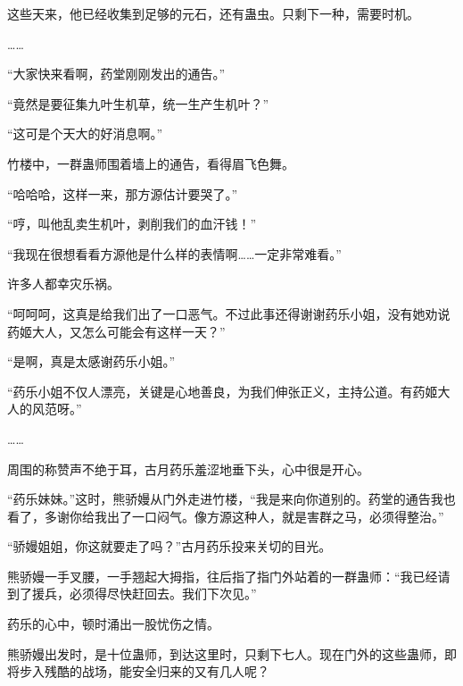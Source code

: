 \begin{this_body}
这些天来，他已经收集到足够的元石，还有蛊虫。只剩下一种，需要时机。

……

“大家快来看啊，药堂刚刚发出的通告。”

“竟然是要征集九叶生机草，统一生产生机叶？”

“这可是个天大的好消息啊。”

竹楼中，一群蛊师围着墙上的通告，看得眉飞色舞。

“哈哈哈，这样一来，那方源估计要哭了。”

“哼，叫他乱卖生机叶，剥削我们的血汗钱！”

“我现在很想看看方源他是什么样的表情啊……一定非常难看。”

许多人都幸灾乐祸。

“呵呵呵，这真是给我们出了一口恶气。不过此事还得谢谢药乐小姐，没有她劝说药姬大人，又怎么可能会有这样一天？”

“是啊，真是太感谢药乐小姐。”

“药乐小姐不仅人漂亮，关键是心地善良，为我们伸张正义，主持公道。有药姬大人的风范呀。”

……

周围的称赞声不绝于耳，古月药乐羞涩地垂下头，心中很是开心。

“药乐妹妹。”这时，熊骄嫚从门外走进竹楼，“我是来向你道别的。药堂的通告我也看了，多谢你给我出了一口闷气。像方源这种人，就是害群之马，必须得整治。”

“骄嫚姐姐，你这就要走了吗？”古月药乐投来关切的目光。

熊骄嫚一手叉腰，一手翘起大拇指，往后指了指门外站着的一群蛊师：“我已经请到了援兵，必须得尽快赶回去。我们下次见。”

药乐的心中，顿时涌出一股忧伤之情。

熊骄嫚出发时，是十位蛊师，到达这里时，只剩下七人。现在门外的这些蛊师，即将步入残酷的战场，能安全归来的又有几人呢？

\end{this_body}

